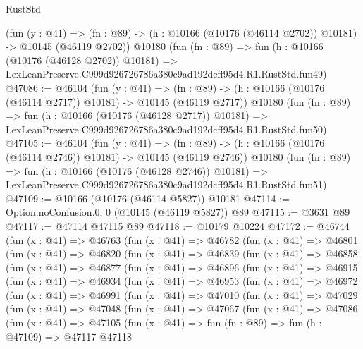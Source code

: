 \begin{lexlean}{RustStd}
\begin{coremodule}
    (fun (y : @41) =>
    (fn : @89) -> (h : @10166 (@10176 (@46114 @2702)) @10181) -> @10145 (@46119 @2702))
    @10180
    (fun (fn : @89) =>
    fun (h : @10166 (@10176 (@46128 @2702)) @10181) =>
    LexLeanPreserve.C999d926726786a380c9ad192dcff95d4.R1.RustStd.fun49)
@47086 := @46104
    (fun (y : @41) =>
    (fn : @89) -> (h : @10166 (@10176 (@46114 @2717)) @10181) -> @10145 (@46119 @2717))
    @10180
    (fun (fn : @89) =>
    fun (h : @10166 (@10176 (@46128 @2717)) @10181) =>
    LexLeanPreserve.C999d926726786a380c9ad192dcff95d4.R1.RustStd.fun50)
@47105 := @46104
    (fun (y : @41) =>
    (fn : @89) -> (h : @10166 (@10176 (@46114 @2746)) @10181) -> @10145 (@46119 @2746))
    @10180
    (fun (fn : @89) =>
    fun (h : @10166 (@10176 (@46128 @2746)) @10181) =>
    LexLeanPreserve.C999d926726786a380c9ad192dcff95d4.R1.RustStd.fun51)
@47109 := @10166 (@10176 (@46114 @5827)) @10181
@47114 := Option.noConfusion.{0, 0} (@10145 (@46119 @5827)) @89
@47115 := @3631 @89
@47117 := @47114 @47115 @89
@47118 := @10179 @10224
@47172 := @46744
    (fun (x : @41) =>
    @46763
      (fun (x : @41) =>
      @46782
        (fun (x : @41) =>
        @46801
          (fun (x : @41) =>
          @46820
            (fun (x : @41) =>
            @46839
              (fun (x : @41) =>
              @46858
                (fun (x : @41) =>
                @46877
                  (fun (x : @41) =>
                  @46896
                    (fun (x : @41) =>
                    @46915
                      (fun (x : @41) =>
                      @46934
                        (fun (x : @41) =>
                        @46953
                          (fun (x : @41) =>
                          @46972
                            (fun (x : @41) =>
                            @46991
                              (fun (x : @41) =>
                              @47010
                                (fun (x : @41) =>
                                @47029
                                  (fun (x : @41) =>
                                  @47048
                                    (fun (x : @41) =>
                                    @47067
                                      (fun (x : @41) =>
                                      @47086
                                        (fun (x : @41) =>
                                        @47105
                                          (fun (x : @41) =>
                                          fun (fn : @89) =>
                                          fun (h : @47109) =>
                                          @47117
                                            @47118

\end{coremodule}
\end{lexlean}
